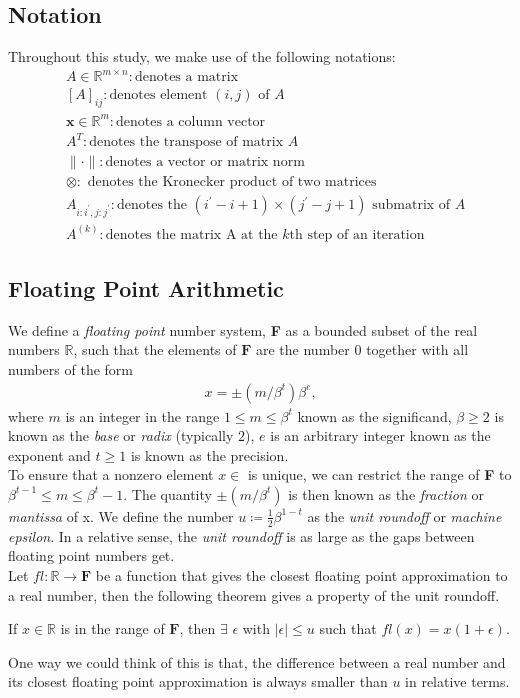 \subsection{Notation}
Throughout this study, we make use of the following notations:
\begin{align*}\nonumber
	&A \in \mathbb{R}^{m\times n}: \text{denotes a matrix}\\
	&[A]_{ij}: \text{denotes element $(i, j)$ of $A$}\\
	&\mathbf{x} \in \mathbb{R}^{m}: \text{denotes a column vector}\\
	&A^{T}: \text{denotes the transpose of matrix $A$}\\
	&\| \cdot \|: \text{denotes a vector or matrix norm }\\
	& \otimes: \text{ denotes the Kronecker product of two matrices}\\
	&A_{i:i^\prime, j:j^\prime}: \text{denotes the $(i^\prime - i + 1) \times (j^\prime - j + 1)$ submatrix of $A$}\\
	&A^{(k)}: \text{denotes the matrix A at the $k$th step of an iteration}
\end{align*}
\subsection{Floating Point Arithmetic}
We define a \textit{floating point} number system, \textbf{F} as a bounded subset of the real numbers $\mathbb{R}$, such that the elements of $\mathbf{F}$ are the number $0$ together with all numbers of the form
\begin{align*}
	x = \pm(m / \beta^t)\beta^e\text{{,}}
\end{align*}
where $m$ is an integer in the range $1\leq m\leq \beta^t$ known as the significand, $\beta \geq 2$ is known as the \textit{base} or \textit{radix} (typically $2$), $e$ is an arbitrary integer known as the exponent and $t\geq 1$ is known as the precision.\\
To ensure that a nonzero element $x \in$  is unique, we can restrict the range of \textbf{F} to $\beta^{t-1} \leq m \leq \beta^t - 1$. The quantity $\pm(m/\beta^t)$ is then known as the \textit{fraction} or \textit{mantissa} of x. We define the number $u \coloneq \frac{1}{2}\beta^{1-t}$ as the \textit{unit roundoff} or \textit{machine epsilon}. In a relative sense, the \textit{unit roundoff} is as large as the gaps between floating point numbers get.\\
Let $fl :  \mathbb{R} \rightarrow \mathbf{F}$ be a function that gives the closest floating point approximation to a real number, then the following theorem gives a property of the unit roundoff.
\begin{theorem}
	If $x \in \mathbb{R}$ is in the range of $\mathbf{F}$, then $\exists$ $\epsilon$ with $|\epsilon| \le u$ such that $fl(x) = x(1+\epsilon)$.
\end{theorem}
One way we could think of this is that, the difference between a real number and its closest floating point approximation is always smaller than $u$ in relative terms.

